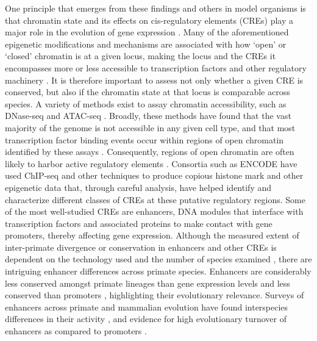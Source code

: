 One principle that emerges from these findings and others in model organisms is that chromatin state and its effects on cis-regulatory elements (CREs) play a major role in the evolution of gene expression \cite{Romero.2012, Degner.2012}. Many of the aforementioned epigenetic modifications and mechanisms are associated with how `open' or `closed' chromatin is at a given locus, making the locus and the CREs it encompasses more or less accessible to transcription factors and other regulatory machinery \cite{Calo.2013}. It is therefore important to assess not only whether a given CRE is conserved, but also if the chromatin state at that locus is comparable across species. A variety of methods exist to assay chromatin accessibility, such as DNase-seq and ATAC-seq \cite{Klein.2020, Tsompana.2014, Buenrostro.2015}. Broadly, these methods have found that the vast majority of the genome is not accessible in any given cell type, and that most transcription factor binding events occur within regions of open chromatin identified by these assays \cite{Thurman.2012}. Consequently, regions of open chromatin are often likely to harbor active regulatory elements \cite{Song.2011, Klemm.2019}. Consortia such as ENCODE have used ChIP-seq and other techniques to produce copious histone mark and other epigenetic data that, through careful analysis, have helped identify and characterize different classes of CREs at these putative regulatory regions\cite{consortium.2012a, Li.2018, Ernst.2012, Hoffman.2012}. Some of the most well-studied CREs are enhancers, DNA modules that interface with transcription factors and associated proteins to make contact with gene promoters, thereby affecting gene expression. Although the measured extent of inter-primate divergence or conservation in enhancers and other CREs is dependent on the technology used and the number of species examined \cite{Edsall.2019, Swain-Lenz.2019}, there are intriguing enhancer differences across primate species. Enhancers are considerably less conserved amongst primate lineages than gene expression levels \cite{Villar.2015, Berthelot.2018} and less conserved than promoters \cite{Trizzino.2017}, highlighting their evolutionary relevance. Surveys of enhancers across primate and mammalian evolution have found interspecies differences in their activity \cite{Klein.2018, Prescott.2015, Shibata.2012}, and evidence for high evolutionary turnover of enhancers as compared to promoters \cite{Carelli.2018, Villar.2015)}.

